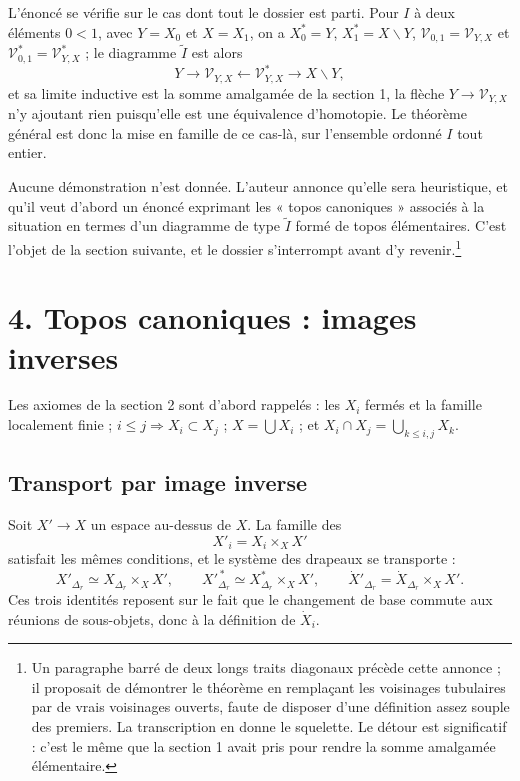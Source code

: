 \documentclass[11pt,a4paper]{article}
\begin{document}
L'énoncé se vérifie sur le cas dont tout le dossier est parti. Pour $I$ à deux
éléments $0 < 1$, avec $Y = X_{0}$ et $X = X_{1}$, on a $X_{0}^{*} = Y$,
$X_{1}^{*} = X \smallsetminus Y$, $\mathcal{V}_{0,1} = \mathcal{V}_{Y,X}$ et
$\mathcal{V}^{*}_{0,1} = \mathcal{V}^{*}_{Y,X}$ ; le diagramme $\widetilde{I}$
est alors
\[
  Y \longrightarrow \mathcal{V}_{Y,X} \longleftarrow \mathcal{V}^{*}_{Y,X}
  \longrightarrow X \smallsetminus Y,
\]
et sa limite inductive est la somme amalgamée de la section 1, la
flèche $Y \to \mathcal{V}_{Y,X}$ n'y ajoutant rien puisqu'elle est une
équivalence d'homotopie. Le théorème général est donc la mise en famille de ce
cas-là, sur l'ensemble ordonné $I$ tout entier.

Aucune démonstration n'est donnée. L'auteur annonce qu'elle sera heuristique, et
qu'il veut d'abord un énoncé exprimant les « topos canoniques » associés à la
situation en termes d'un diagramme de type $\widetilde{I}$ formé de topos
élémentaires. C'est l'objet de la section suivante, et le dossier s'interrompt
avant d'y revenir.\footnote{Un paragraphe barré de deux longs traits diagonaux
précède cette annonce ; il proposait de démontrer le théorème en remplaçant les
voisinages tubulaires par de vrais voisinages ouverts, faute de disposer d'une
définition assez souple des premiers. La transcription en donne le squelette. Le
détour est significatif : c'est le même que la section 1 avait pris pour rendre
la somme amalgamée élémentaire.}

\section*{4. Topos canoniques : images inverses}

Les axiomes de la section 2 sont d'abord rappelés : les $X_{i}$ fermés et la
famille localement finie ; $i \leq j \Rightarrow X_{i} \subset X_{j}$ ;
$X = \bigcup X_{i}$ ; et $X_{i} \cap X_{j} = \bigcup_{k \leq i,j} X_{k}$.

\subsection*{Transport par image inverse}

Soit $X' \to X$ un espace au-dessus de $X$. La famille des
\[
  X'_{i} = X_{i} \times_{X} X'
\]
satisfait les mêmes conditions, et le système des drapeaux se transporte :
\[
  X'_{\Delta_{r}} \simeq X_{\Delta_{r}} \times_{X} X', \qquad
  X'^{\,*}_{\Delta_{r}} \simeq X^{*}_{\Delta_{r}} \times_{X} X', \qquad
  \dot{X}'_{\Delta_{r}} = \dot{X}_{\Delta_{r}} \times_{X} X'.
\]
Ces trois identités reposent sur le fait que le changement de base commute aux
réunions de sous-objets, donc à la définition de $\dot{X}_{i}$.
\end{document}
